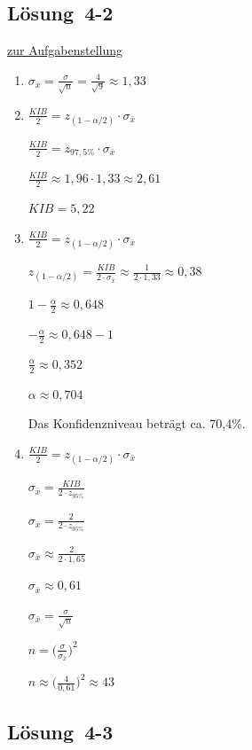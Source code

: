 \documentclass[
  11pt,
  ngerman,
  a4paper,
]{report}
\begin{document}
\hypertarget{loesung-4-2}{%
\subsection{Lösung~4-2}\label{loesung-4-2}}

\protect\hyperlink{aufgabe-4-2}{zur Aufgabenstellung}

\begin{enumerate}
\def\labelenumi{\alph{enumi})}
\item
  \(\sigma _{\bar{x}}=\frac{\sigma}{\sqrt{n}}=\frac{4}{\sqrt{9}}\approx1{,}33\)
\item
  \(\frac{\mathit{KIB}}{2}=z_{(1-\alpha/2)} \cdot \sigma_{\bar{x}}\)

  \(\frac{\mathit{KIB}}{2}= z_{97{,}5\%}\cdot \sigma_{\bar{x}}\)

  \(\frac{\mathit{KIB}}{2}\approx 1{,}96 \cdot 1{,}33 \approx 2{,}61\)

  \(\mathit{KIB}=5{,}22\)
\item
  \(\frac{\mathit{KIB}}{2}=z_{(1-\alpha/2)} \cdot \sigma_{\bar{x}}\)

  \(z_{(1-\alpha/2)} = \frac{\mathit{KIB}}{2 \cdot \sigma_{\bar{x}}}\approx\frac{1}{2 \cdot 1{,}33}\approx0{,}38\)

  \(1-\frac{\alpha}{2} \approx 0{,}648\)

  \(-\frac{\alpha}{2} \approx 0{,}648 - 1\)

  \(\frac{\alpha}{2} \approx 0{,}352\)

  \(\alpha \approx 0{,}704\)

  Das Konfidenzniveau beträgt ca. 70,4\%.
\item
  \(\frac{\mathit{KIB}}{2} = z_{(1-\alpha/2)} \cdot \sigma_{\bar{x}}\)

  \(\sigma_{\bar{x}} = \frac{\mathit{KIB}}{2\cdot z_{95\%}}\)

  \(\sigma_{\bar{x}} = \frac{2}{2 \cdot z_{95\%}}\)

  \(\sigma_{\bar{x}} \approx \frac{2}{2 \cdot 1{,}65}\)

  \(\sigma_{\bar{x}} \approx 0{,}61\)

  \(\sigma_{\bar{x}}=\frac{\sigma}{\sqrt{n}}\)

  \(n = \big(\frac{\sigma}{\sigma_{\bar{x}}}\big)^2\)

  \(n \approx \big(\frac{4}{0{,}61}\big)^2\approx43\)
\end{enumerate}

\hypertarget{loesung-4-3}{%
\subsection{Lösung~4-3}\label{loesung-4-3}}
\end{document}
